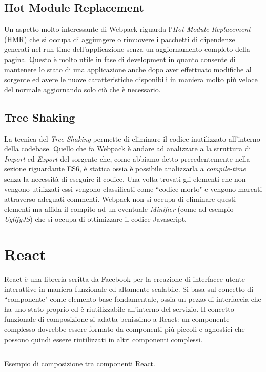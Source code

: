 \subsection{Hot Module Replacement}
Un aspetto molto interessante di Webpack riguarda l'\textit{Hot Module Replacement} (HMR) che si occupa di aggiungere o rimuovere i pacchetti di dipendenze generati nel run-time dell'applicazione senza un aggiornamento completo della pagina. Questo è molto utile in fase di development in quanto consente di mantenere lo stato di una applicazione anche dopo aver effettuato modifiche al sorgente ed avere le nuove caratteristiche disponibili in maniera molto più veloce del normale aggiornando solo ciò che è necessario. 



\subsection{Tree Shaking}
La tecnica del \textit{Tree Shaking} permette di eliminare il codice inutilizzato all'interno della codebase. Quello che fa Webpack è andare ad analizzare a la struttura di \textit{Import} ed \textit{Export} del sorgente che, come abbiamo detto precedentemente nella sezione riguardante ES6, è statica ossia è possibile analizzarla a \textit{compile-time} senza la necessità di eseguire il codice. Una volta trovati gli elementi che non vengono utilizzati essi vengono classificati come “codice morto" e vengono marcati attraverso adeguati commenti. Webpack non si occupa di eliminare questi elementi ma affida il compito ad un eventuale \textit{Minifier} (come ad esempio \textit{UglifyJS}) che si occupa di ottimizzare il codice Javascript.

\section{React}
React è una libreria scritta da Facebook per la creazione di interfacce utente interattive in maniera funzionale ed altamente scalabile. Si basa sul concetto di “componente" come elemento base fondamentale, ossia un pezzo di interfaccia che ha uno stato proprio ed è riutilizzabile all'interno del servizio. Il concetto funzionale di composizione si adatta benissimo a React: un componente complesso dovrebbe essere formato da componenti più piccoli e agnostici che possono quindi essere riutilizzati in altri componenti complessi.

\begin{listing}[ht]
\inputminted{jsx}{sources/exampleReactComponents.js}
\caption{Esempio di composizione tra componenti React.}
\label{exampleReactComponents}
\end{listing}

